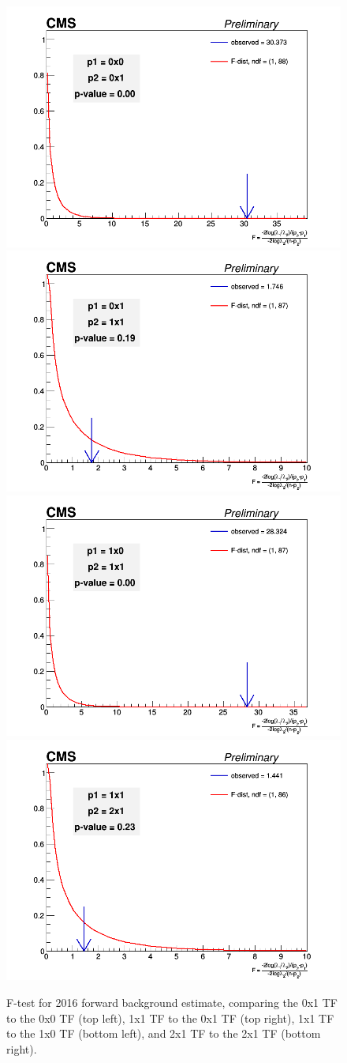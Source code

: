             
                        \begin{figure}[!htbp]
                \begin{center}
                \includegraphics[width=0.4\linewidth]{Plots/tests/ftest_fwd_0x0_vs_0x1_2016.png}
                \includegraphics[width=0.4\linewidth]{Plots/tests/ftest_fwd_0x1_vs_1x1_2016.png}
                \includegraphics[width=0.4\linewidth]{Plots/tests/ftest_fwd_1x0_vs_1x1_2016.png}
                \includegraphics[width=0.4\linewidth]{Plots/tests/ftest_fwd_1x1_vs_2x1_2016.png}
    
                    \caption{F-test for 2016 forward background estimate, comparing the 0x1 TF to the 0x0 TF (top left), 1x1 TF to the 0x1 TF (top right), 1x1 TF to the 1x0 TF (bottom left), and 2x1 TF to the 2x1 TF (bottom right).}
                    \label{fig:ftest16}
                \end{center}
            \end{figure}
            



